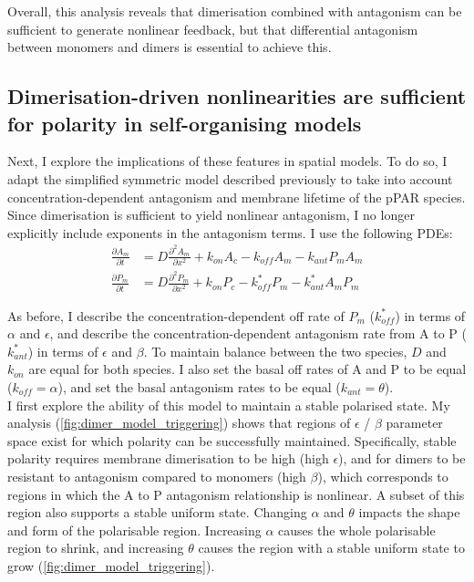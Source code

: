 \documentclass[12pt]{"report"}
\begin{document}
Overall, this analysis reveals that dimerisation combined with antagonism can be sufficient to generate nonlinear feedback, but that differential antagonism between monomers and dimers is essential to achieve this.\\


\subsection{Dimerisation-driven nonlinearities are sufficient for polarity in self-organising models}

Next, I explore the implications of these features in spatial models. To do so, I adapt the simplified symmetric model described previously to take into account concentration-dependent antagonism and membrane lifetime of the pPAR species. Since dimerisation is sufficient to yield nonlinear antagonism, I no longer explicitly include exponents in the antagonism terms. I use the following PDEs:
\begin{align}
\frac{\partial A_m}{\partial t} &= D \frac{\partial^2 A_m}{\partial x^2} + k_{on} A_c - k_{off} A_m - k_{ant} P_m A_m\\
\frac{\partial P_m}{\partial t} &= D \frac{\partial^2 P_m}{\partial x^2} + k_{on} P_c - k_{off}^* P_m - k_{ant}^* A_m P_m
\end{align}

As before, I describe the concentration-dependent off rate of $P_m$ ($k_{off}^*$) in terms of $\alpha$ and $\epsilon$, and describe the concentration-dependent antagonism rate from A to P ($k_{ant}^*$) in terms of $\epsilon$ and $\beta$. To maintain balance between the two species, $D$ and $k_{on}$ are equal for both species. I also set the basal off rates of A and P to be equal ($k_{off} = \alpha$), and set the basal antagonism rates to be equal ($k_{ant} = \theta$).\\

I first explore the ability of this model to maintain a stable polarised state. My analysis (\cref{fig:dimer_model_triggering}) shows that regions of $\epsilon$ / $\beta$ parameter space exist for which polarity can be successfully maintained. Specifically, stable polarity requires membrane dimerisation to be high (high $\epsilon$), and for dimers to be resistant to antagonism compared to monomers (high $\beta$), which corresponds to regions in which the A to P antagonism relationship is nonlinear. A subset of this region also supports a stable uniform state. Changing $\alpha$ and $\theta$ impacts the shape and form of the polarisable region. Increasing $\alpha$ causes the whole polarisable region to shrink, and increasing $\theta$ causes the region with a stable uniform state to grow (\cref{fig:dimer_model_triggering}).\\
\end{document}
